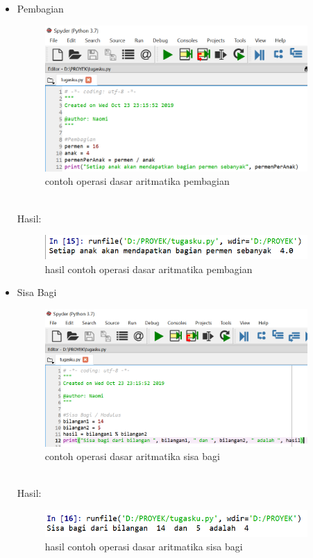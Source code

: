 \begin{enumerate}
\begin{itemize}
\item Pembagian
\begin{figure}[!htbp]
\centering
\includegraphics[width=10cm]{gambar2/bagi.png}
\caption{contoh operasi dasar aritmatika pembagian}
\end{figure}\\
\newpage
Hasil:
\begin{figure}[!htbp]
\centering
\includegraphics[width=10cm]{gambar2/bagi1.png}
\caption{hasil contoh operasi dasar aritmatika pembagian}
\end{figure}

\item Sisa Bagi
\begin{figure}[!htbp]
\centering
\includegraphics[width=10cm]{gambar2/modulus.png}
\caption{contoh operasi dasar aritmatika sisa bagi}
\end{figure}\\
Hasil:
\begin{figure}[!htbp]
\centering
\includegraphics[width=10cm]{gambar2/modulus1.png}
\caption{hasil contoh operasi dasar aritmatika sisa bagi}
\end{figure}


\end{itemize}
\end{enumerate}
